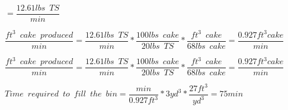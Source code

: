 \begin{enumerate}[1.]
{$=\dfrac{12.61lbs \enspace TS}{min}$}\\
\vspace{3mm}

{$\dfrac{ft^3 \enspace cake \enspace produced}{min}=\dfrac{12.61lbs \enspace TS}{min}*\dfrac{100 lbs \enspace cake}{20lbs \enspace TS}*\dfrac{ft^3 \enspace cake}{68 lbs \enspace cake} = \dfrac{0.927ft^3 cake}{min}$}\\
\vspace{3mm}

{$\dfrac{ft^3 \enspace cake \enspace produced}{min}=\dfrac{12.61lbs \enspace TS}{min}*\dfrac{100 lbs \enspace cake}{20lbs \enspace TS}*\dfrac{ft^3 \enspace cake}{68 lbs \enspace cake} = \dfrac{0.927ft^3 cake}{min}$}\\
\vspace{3mm}

{$Time \enspace required \enspace to \enspace fill \enspace the \enspace bin=\dfrac{min}{0.927ft^3}*{3yd^3}*\dfrac{27ft^3}{yd^3}=\boxed{75min}$}\\


\end{enumerate}

